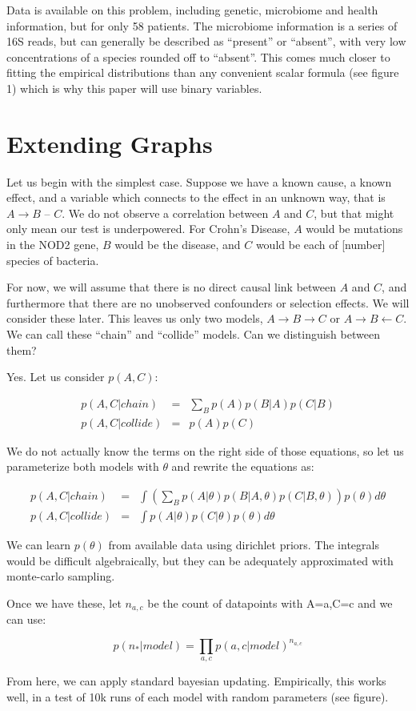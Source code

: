 \documentclass[twocolumn,12pt]{article}
\begin{document}
Data is available on this problem, including genetic, microbiome and
health information, but for only 58 patients.  The microbiome
information is a series of 16S reads, but can generally be described
as ``present'' or ``absent'', with very low concentrations of a
species rounded off to ``absent''.  This comes much closer to fitting
the empirical distributions than any convenient scalar formula (see
figure 1) which is why this paper will use binary variables.

\section{Extending Graphs}

Let us begin with the simplest case.  Suppose we have a known cause, a
known effect, and a variable which connects to the effect in an
unknown way, that is $A \rightarrow B$ -- $C$.  We do not observe a
correlation between $A$ and $C$, but that might only mean our test is
underpowered.  For Crohn's Disease, $A$ would be mutations in the NOD2
gene, $B$ would be the disease, and $C$ would be each of [number]
species of bacteria.

For now, we will assume that there is no direct causal
link between $A$ and $C$, and furthermore that there are no unobserved
confounders or selection effects.  We will consider these later.
This leaves us only two models, $A \rightarrow B \rightarrow C$ or $A
\rightarrow B \leftarrow C$.  We can call these ``chain'' and
``collide'' models.  Can we distinguish between them?

Yes.  Let us consider
$p(A,C)$:

\begin{eqnarray}
p(A,C|chain) & = & \sum_B p(A)p(B|A)p(C|B) \\
p(A,C|collide) & = & p(A)p(C)
\end{eqnarray}

We do not actually know the terms on the right side of those
equations, so let us parameterize both models with $\theta$ and
rewrite the equations as:

\begin{eqnarray}
  p(A,C|chain) & = & \int \left ( 
  \sum_B p(A|\theta)p(B|A,\theta)p(C|B,\theta)
  \right ) p(\theta) d\theta \\
  p(A,C|collide) & = & \int p(A|\theta)p(C|\theta)p(\theta) d\theta
\end{eqnarray}

We can learn $p(\theta)$ from available data using dirichlet priors.
The integrals would be difficult algebraically, but they can be
adequately approximated with monte-carlo sampling.

Once we have these, let $n_{a,c}$ be the count of datapoints with
A=a,C=c and we can use:

\begin{equation}
p(n_*|model) = \prod_{a,c} p(a,c|model)^{n_{a,c}}
\end{equation}

From here, we can apply standard bayesian updating.  Empirically, this
works well, in a test of 10k runs of each model with random parameters
(see figure).
\end{document}
